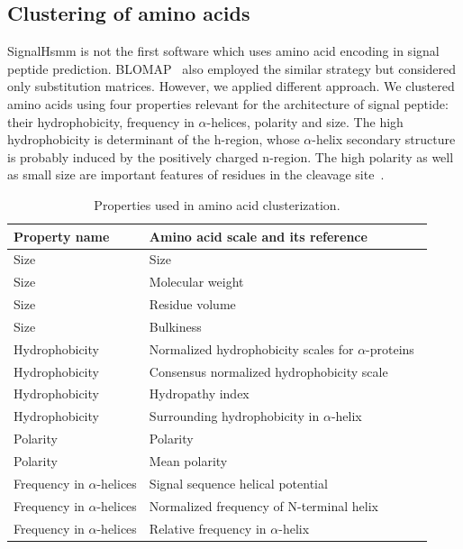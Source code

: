 \documentclass[fleqn,10pt,twoside]{gcb15submission}
\begin{document}
\subsection*{Clustering of amino acids}

SignalHsmm is not the first software which uses amino acid encoding in signal peptide prediction. BLOMAP~\citep{maetschke2005blomap} also employed the similar strategy but considered only substitution matrices. However, we applied different approach. We clustered amino acids using four properties relevant for the architecture of signal peptide: their hydrophobicity, frequency in $\alpha$-helices, polarity and size. The high hydrophobicity is determinant of the h-region, whose $\alpha$-helix secondary structure is probably induced by the positively charged n-region. The high polarity as well as small size are important features of residues in the cleavage site~\citep{1994palzkillselection}.

\begin{table}[ht]
\small
\centering
\caption{Properties used in amino acid clusterization.} 
\begin{tabular}{ll}
  \toprule
Property name & Amino acid scale and its reference \\ 
  \midrule
Size & Size~\citep{dawson1972size} \\ 
   \rowcolor[gray]{0.85}Size & Molecular weight~\citep{fasman1976handbook}\\ 
  Size & Residue volume~\citep{1973goldsackcontribution} \\ 
   \rowcolor[gray]{0.85}Size & Bulkiness~\citep{1968zimmermanthe} \\ 
  Hydrophobicity & Normalized hydrophobicity scales for $\alpha$-proteins~\citep{1992cidhydrophobicity} \\ 
   \rowcolor[gray]{0.85}Hydrophobicity & Consensus normalized hydrophobicity scale~\citep{1984eisenbergthreedimensional} \\ 
  Hydrophobicity & Hydropathy index~\citep{1982kytea} \\ 
   \rowcolor[gray]{0.85}Hydrophobicity & Surrounding hydrophobicity in $\alpha$-helix~\citep{1980ponnuswamyhydrophobic} \\ 
  Polarity & Polarity~\citep{1974granthamamino} \\ 
   \rowcolor[gray]{0.85}Polarity & Mean polarity~\citep{1988radzickainfluences} \\ 
  Frequency in $\alpha$-helices & Signal sequence helical potential~\citep{1982argosstructural} \\ 
   \rowcolor[gray]{0.85}Frequency in $\alpha$-helices & Normalized frequency of N-terminal helix~\citep{chou1978prediction} \\ 
  Frequency in $\alpha$-helices & Relative frequency in $\alpha$-helix~\citep{1990prabhakaranthe} \\ 
   \bottomrule
\end{tabular}
\label{tab:aaprop}
\end{table}
\end{document}
